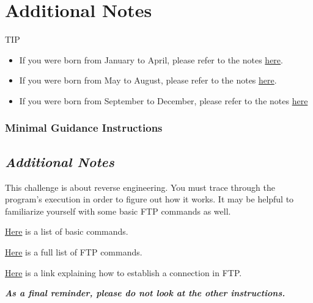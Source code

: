 {                \section*{Additional Notes}
                    TIP
                    \begin{itemize}
                        \item If you were born from January to April, please refer to the notes \href{https://github.com/brendonky18/Honors-Thesis.CTFs/blob/main/going-backwards/notes_0.md}{here}.
                        \item If you were born from May to August, please refer to the notes \href{https://github.com/brendonky18/Honors-Thesis.CTFs/blob/main/going-backwards/notes_1.md}{here}.
                        \item If you were born from September to December, please refer to the notes \href{https://github.com/brendonky18/Honors-Thesis.CTFs/blob/main/going-backwards/notes_1.md}{here}
                    \end{itemize}

            }
        \newpage
        \subsubsection{Minimal Guidance Instructions}
            {\parindent0pt\singlespacing
                \subsection*{\textit{Additional Notes}}
                    This challenge is about reverse engineering. You must trace through the program's execution in order to figure out how it works. It may be helpful to familiarize yourself with some basic FTP commands as well. 

                    \href{https://kb.iu.edu/d/aenq}{Here} is a list of basic commands.

                    \href{https://en.wikipedia.org/wiki/List_of_FTP_commands}{Here} is a full list of FTP commands.

                    \href{https://www.serv-u.com/resource/tutorial/pasv-response-epsv-port-pbsz-rein-ftp-command#fac52a38-7ddb-4815-a9dc-72cc03c0a8e6}{Here} is a link explaining how to establish a connection in FTP.

                    \textbf{\textit{As a final reminder, please do not look at the other instructions.}}
            }
        \newpage

